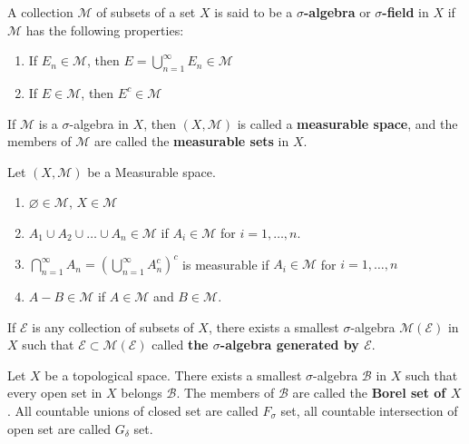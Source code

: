 \documentclass[12pt, a4paper, oneside]{book}
\begin{document}
\begin{definition}
    A collection $\mathcal{M}$ of subsets of a set $X$ is said to be a \textbf{$\sigma$-algebra} or \textbf{$\sigma$-field} in $X$
    if $\mathcal{M}$ has the following properties:
    \begin{enumerate}[label=(\roman*)]
        \item
              If $E_n\in \mathcal{M}$, then $E=\bigcup\limits_{n=1}^{\infty}E_n\in \mathcal{M}$
        \item
              If $E\in\mathcal{M}$, then $E^c\in\mathcal{M}$
    \end{enumerate}
    If $\mathcal{M}$ is a $\sigma$-algebra in $X$, then $\left(X,\mathcal{M}\right)$ is called a \textbf{measurable space},
    and the members of $\mathcal{M}$ are called the \textbf{measurable sets} in $X$.
\end{definition}
\begin{proposition}
    Let $\left(X,\mathcal{M}\right)$ be a Measurable space.
    \begin{enumerate}
        \item
              $\varnothing\in\mathcal{M}$, $X\in \mathcal{M}$

        \item
              $A_1\cup A_2\cup\ldots\cup A_n\in\mathcal{M}$ if $A_i\in\mathcal{M}$  for $i=1,\ldots,n$.

        \item
              $\bigcap_{n=1}^\infty A_n=\left(\bigcup_{n=1}^\infty A_n^c\right)^c$ is measurable if $A_i\in\mathcal{M}$  for $i=1,\ldots,n$

        \item
              $A-B\in \mathcal{M}$ if $A\in \mathcal{M}$ and $B\in \mathcal{M}$.
    \end{enumerate}
\end{proposition}


\begin{definition}
    If $\mathcal{E}$ is any collection of subsets of $X$, there exists a smallest
    $\sigma$-algebra $\mathcal{M}\left(\mathcal{E}\right)$ in $X$ such that $\mathcal{E}\subset\mathcal{M}\left(\mathcal{E}\right)$ called
    \textbf{the $\sigma$-algebra generated by $\mathcal{E}$}.

    Let $X$ be a topological space. There exists a smallest $\sigma$-algebra $\mathcal{B}$ in $X$
    such that every open set in $X$ belongs $\mathcal{B}$. The  members of $\mathcal{B}$ are called the \textbf{Borel set of $X$}.
    All countable unions of closed set are called $F_{\sigma}$ set, all countable
    intersection of open  set are called $G_{\delta}$ set.
\end{definition}
\end{document}

